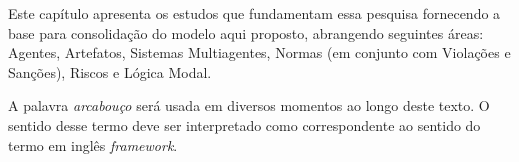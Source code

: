 Este capítulo apresenta os estudos que fundamentam essa pesquisa fornecendo a base para consolidação do modelo aqui proposto, abrangendo seguintes áreas: Agentes, Artefatos, Sistemas Multiagentes, Normas (em conjunto com Violações e Sanções), Riscos e Lógica Modal. 

A palavra \textit{arcabouço} será usada em diversos momentos ao longo deste texto. O sentido desse termo deve ser interpretado como correspondente ao sentido do termo em inglês \textit{framework}.
